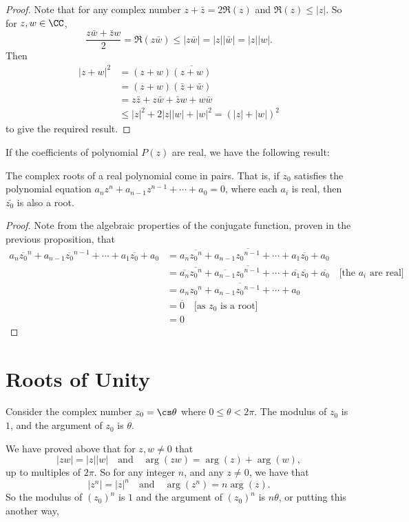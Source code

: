 \begin{proof}
Note that for any complex number $z+\bar{z}=2\Re(z)$ and $\Re(z)\le|z|$. So for $z,w \in \CC$,
\[ \frac{z\bar{w}+\bar{z}w}{2}=\Re(z\bar{w})\le|z\bar{w}|=|z||\bar{w}|=|z||w|. \]
Then
\begin{align*}
|z+w|^2 &= (z+w)\overline{(z+w)} \\
&= (z+w)(\bar{z}+\bar{w}) \\
&= z\bar{z}+z\bar{w}+\bar{z}w+w\bar{w} \\
&\le |z|^2+2|z||w|+|w|^2=(|z|+|w|)^2
\end{align*}
to give the required result.
\end{proof}

If the coefficients of polynomial $P(z)$ are real, we have the following result:
\begin{theorem}
The complex roots of a real polynomial come in pairs. That is, if $z_0$ satisfies the polynomial
equation $a_nz^n+a_{n-1}z^{n-1}+\cdots+a_0=0$, where each $a_i$ is real, then $\bar{z_0}$ is also a root.
\end{theorem}
	
\begin{proof}
Note from the algebraic properties of the conjugate function, proven in the previous proposition, that
\begin{align*}
a_n\overline{z_0}^n+a_{n-1}\overline{z_0}^{n-1}+\cdots+a_1\overline{z_0}+a_0
&= a_n\overline{{z_0}^n}+a_{n-1}\overline{{z_0}^{n-1}}+\cdots+a_1\overline{z_0}+a_0 \\
&= \overline{a_n}\overline{{z_0}^n}+\overline{a_{n-1}}\overline{{z_0}^{n-1}}+\cdots+\overline{a_1}\overline{z_0}+\overline{a_0} \quad \text{[the $a_i$ are real]} \\
&= \overline{a_n{z_0}^n+a_{n-1}{z_0}^{n-1}+\cdots+a_0} \\
&= \overline{0} \quad \text{[as $z_0$ is a root]} \\
&= 0
\end{align*}
\end{proof}

\section{Roots of Unity}
Consider the complex number $z_0=\cs\theta$ where $0\le\theta<2\pi$. The modulus of $z_0$ is $1$, and the argument of $z_0$ is $\theta$.

We have proved above that for $z,w\neq0$ that
\[ |zw|=|z||w| \quad \text{and} \quad \arg(zw)=\arg(z)+\arg(w), \]
up to multiples of $2\pi$. So for any integer $n$, and any $z\neq0$, we have that
\[ |z^n|=|z|^n \quad \text{and} \quad \arg(z^n)=n\arg(z). \]
So the modulus of $(z_0)^n$ is $1$ and the argument of $(z_0)^n$ is $n\theta$, or putting this another way,

